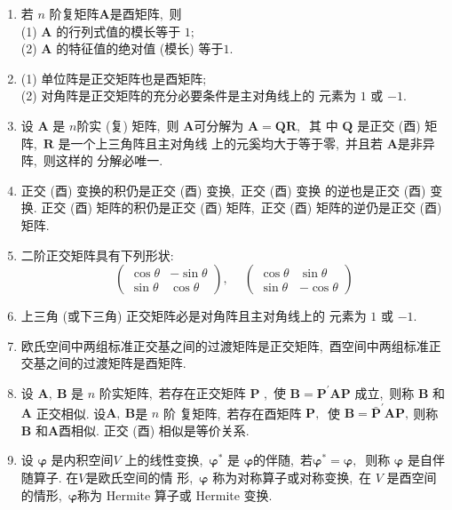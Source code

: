 \begin{enumerate}
		\item 若  $n $ 阶复矩阵$  \boldsymbol{A}  $是酉矩阵,\  则\\
		(1) $ \boldsymbol{A}$ 的行列式值的模长等于 $1 ;$\\
		(2) $ \boldsymbol{A} $ 的特征值的绝对值 (模长) 等于$ 1 .$
		\item (1) 单位阵是正交矩阵也是酉矩阵;\\
		(2) 对角阵是正交矩阵的充分必要条件是主对角线上的 元素为 $1$ 或  $-1 $.
		\item 设  $\boldsymbol{A}$  是 $ n  $阶实 (复) 矩阵,\  则 $ \boldsymbol{A}  $可分解为 $ \boldsymbol{A}=\boldsymbol{Q R} ,\ $ 其 中  $\boldsymbol{Q} $ 是正交 (酉) 矩阵,\  $\boldsymbol{R} $ 是一个上三角阵且主对角线 上的元奚均大于等于零,\  并且若 $ \boldsymbol{A}  $是非异阵,\  则这样的 分解必唯一.
		\item 正交 (酉) 变换的积仍是正交 (酉) 变换,\  正交 (酉) 变换 的逆也是正交 (酉) 变换. 正交 (酉) 矩阵的积仍是正交 (酉) 矩阵,\  正交 (酉) 矩阵的逆仍是正交 (酉) 矩阵.
		\item 二阶正交矩阵具有下列形状:
		$$\left(\begin{array}{cc}
			\cos \theta & -\sin \theta \\
			\sin \theta & \cos \theta
		\end{array}\right),\  \quad
		\left(\begin{array}{cc}
			\cos \theta & \sin \theta \\
			\sin \theta & -\cos \theta
		\end{array}\right)$$
		\item 上三角 (或下三角) 正交矩阵必是对角阵且主对角线上的 元素为 $1$ 或  $-1 .$
		\item 欧氏空间中两组标准正交基之间的过渡矩阵是正交矩阵,\  酉空间中两组标准正交基之间的过渡矩阵是酉矩阵.
		\item 设  $\boldsymbol{A},\  \boldsymbol{B}$  是 $ n$  阶实矩阵,\  若存在正交矩阵  $\boldsymbol{P}$ ,\  使 $ \boldsymbol{B}=   \boldsymbol{P}^{\prime} \boldsymbol{A}\boldsymbol{P}$ 成立,\  则称 $ \boldsymbol{B} $ 和  $\boldsymbol{A}$  正交相似. 设$  \boldsymbol{A},\  \boldsymbol{B}  $是 $ n $ 阶 复矩阵,\  若存在酉矩阵 $ \boldsymbol{P} ,\ $ 使 $ \boldsymbol{B}=\bar{\boldsymbol{P}}^{\prime} \boldsymbol{A} \boldsymbol{P} ,\  $则称 $ \boldsymbol{B} $ 和$  \boldsymbol{A}  $酉相似. 正交 (酉) 相似是等价关系.
		\item 设  $\boldsymbol{\varphi}$  是内积空间$  V $ 上的线性变换,\ $  \boldsymbol{\varphi}^{*} $ 是  $\boldsymbol{\varphi}$的伴随,\  若$  \boldsymbol{\varphi}^{*}=\boldsymbol{\varphi},\ $ 则称  $\boldsymbol{\varphi}$  是自伴随算子. 在$  V  $是欧氏空间的情 形,\   $\boldsymbol{\varphi}$  称为对称算子或对称变换,\  在  $V $ 是酉空间的情形,\  $ \boldsymbol{\varphi} $称为 Hermite 算子或 Hermite 变换.

\end{enumerate}
